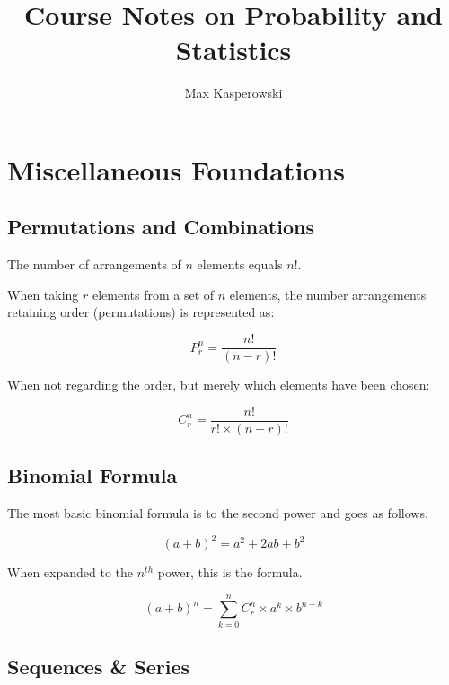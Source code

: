 \documentclass[12pt]{article}
\author{Max Kasperowski}
\title{Course Notes on Probability and Statistics}
\begin{document}
	\maketitle
	\tableofcontents
	\newpage
	
	\section{Miscellaneous Foundations}
	
	\subsection{Permutations and Combinations}
	
	The number of arrangements of \(n\) elements equals \(n!\).
	
	\noindent When taking \(r\) elements from a set of \(n\) elements, the number arrangements retaining order (permutations) is represented as:
	
	\begin{equation*}
	P^{n}_{r}=\frac{n!}{(n-r)!}
	\end{equation*}
	
	\noindent When not regarding the order, but merely which elements have been chosen:
	
	\begin{equation*}
	C^{n}_{r}=\frac{n!}{r!\times (n-r)!}
	\end{equation*}
	
	\subsection{Binomial Formula}
	
	The most basic binomial formula is to the second power and goes as follows.
	
	\begin{equation*}
		(a+b)^2 = a^2+2ab+b^2
	\end{equation*}
	
	\noindent When expanded to the \(n^{th}\) power, this is the formula.
	
	\begin{equation*}
		(a+b)^n = \sum_{k=0}^{n}C^{n}_{r}\times a^k\times b^{n-k}
	\end{equation*}
	
	\subsection{Sequences \& Series}
	
\end{document}
